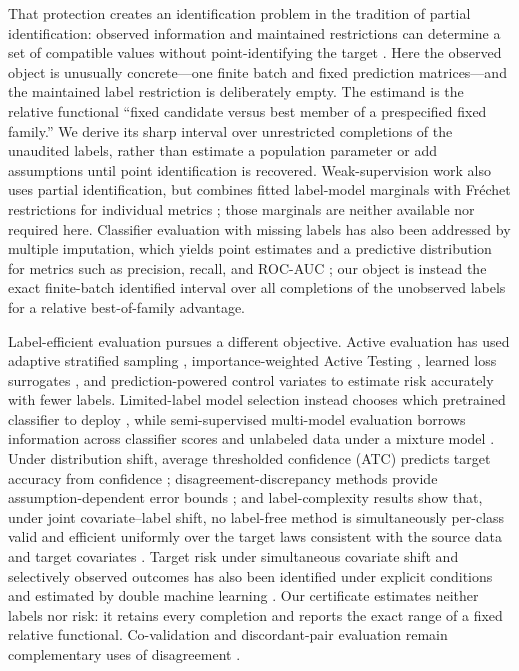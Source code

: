 \documentclass[referee,lineno,pdflatex,sn-vancouver-num]{sn-jnl}
\theoremstyle{thmstyleone}%
\theoremstyle{thmstyletwo}%
\theoremstyle{thmstylethree}%
\begin{document}
That protection creates an identification problem in the tradition of partial identification: observed information and maintained restrictions can determine a set of compatible values without point-identifying the target \cite{manski2003partialidentification,molinari2020microeconometrics}. Here the observed object is unusually concrete---one finite batch and fixed prediction matrices---and the maintained label restriction is deliberately empty. The estimand is the relative functional ``fixed candidate versus best member of a prespecified fixed family.'' We derive its sharp interval over unrestricted completions of the unaudited labels, rather than estimate a population parameter or add assumptions until point identification is recovered. Weak-supervision work also uses partial identification, but combines fitted label-model marginals with Fr\'echet restrictions for individual metrics \cite{polo2024partialidentification}; those marginals are neither available nor required here. Classifier evaluation with missing labels has also been addressed by multiple imputation, which yields point estimates and a predictive distribution for metrics such as precision, recall, and ROC-AUC \cite{dervovic2025model}; our object is instead the exact finite-batch identified interval over all completions of the unobserved labels for a relative best-of-family advantage.

Label-efficient evaluation pursues a different objective. Active evaluation has used adaptive stratified sampling \cite{katariya2012activeevaluation}, importance-weighted Active Testing \cite{kossen2021activetesting}, learned loss surrogates \cite{kossen2022activesurrogate}, and prediction-powered control variates \cite{ashouritaklimi2026predictionpowered} to estimate risk accurately with fewer labels. Limited-label model selection instead chooses which pretrained classifier to deploy \cite{okanovic2025modelselector}, while semi-supervised multi-model evaluation borrows information across classifier scores and unlabeled data under a mixture model \cite{shanmugam2025evaluating}. Under distribution shift, average thresholded confidence (ATC) predicts target accuracy from confidence \cite{garg2022leveraging}; disagreement-discrepancy methods provide assumption-dependent error bounds \cite{rosenfeld2023disagreement,mishra2025odd}; and label-complexity results show that, under joint covariate--label shift, no label-free method is simultaneously per-class valid and efficient uniformly over the target laws consistent with the source data and target covariates \cite{han2026labelcomplexity}. Target risk under simultaneous covariate shift and selectively observed outcomes has also been identified under explicit conditions and estimated by double machine learning \cite{ulichney2026beyond}. Our certificate estimates neither labels nor risk: it retains every completion and reports the exact range of a fixed relative functional. Co-validation and discordant-pair evaluation remain complementary uses of disagreement \cite{madani2004covalidation,musgrove2023discordant}.
\end{document}

